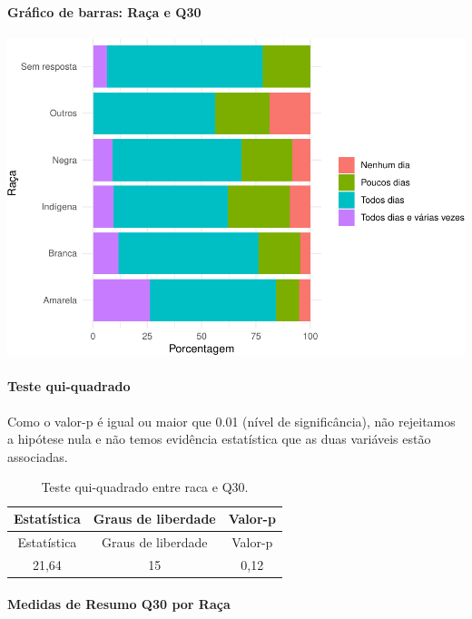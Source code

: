 \documentclass[]{article}
\let\oldparagraph\paragraph
\renewcommand{\paragraph}[1]{\oldparagraph{#1}\mbox{}}
\begin{document}
\hypertarget{gruxe1fico-de-barras-rauxe7a-e-q30}{%
\paragraph{Gráfico de barras: Raça e Q30}\label{gruxe1fico-de-barras-rauxe7a-e-q30}}

\begin{center}\includegraphics[width=0.75\linewidth]{relatorio_covid19_files/figure-latex/unnamed-chunk-987-1} \end{center}

\hypertarget{teste-qui-quadrado-85}{%
\paragraph{Teste qui-quadrado}\label{teste-qui-quadrado-85}}

Como o valor-p é igual ou maior que 0.01 (nível de significância), não rejeitamos a hipótese nula e não temos evidência estatística que as duas variáveis estão associadas.

\begin{longtable}[]{@{}ccc@{}}
\caption{\label{tab:unnamed-chunk-989}Teste qui-quadrado entre raca e Q30.}\tabularnewline
\toprule
Estatística & Graus de liberdade & Valor-p\tabularnewline
\midrule
\endfirsthead
\toprule
Estatística & Graus de liberdade & Valor-p\tabularnewline
\midrule
\endhead
21,64 & 15 & 0,12\tabularnewline
\bottomrule
\end{longtable}

\cleardoublepage

\hypertarget{medidas-de-resumo-q30-por-rauxe7a}{%
\paragraph{Medidas de Resumo Q30 por Raça}\label{medidas-de-resumo-q30-por-rauxe7a}}
\end{document}
